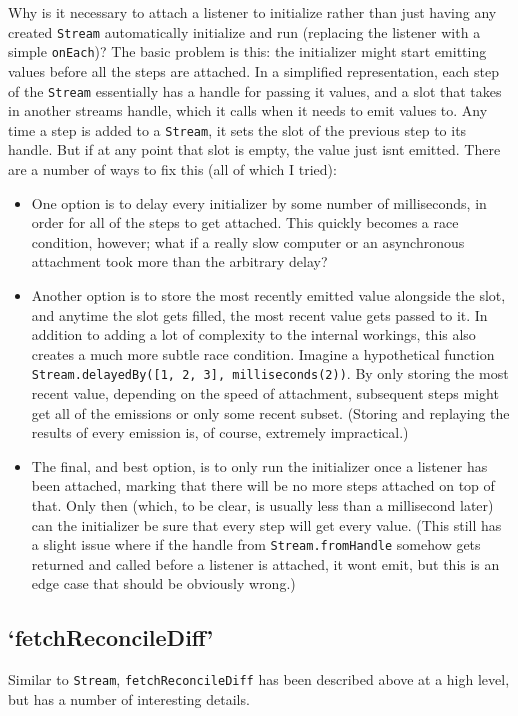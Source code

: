 \documentclass[manuscript,review,anonymous]{acmart}
\begin{document}
Why is it necessary to attach a listener to initialize rather than just
having any created \texttt{Stream} automatically initialize and run
(replacing the listener with a simple \texttt{onEach})? The basic
problem is this: the initializer might start emitting values before all
the steps are attached. In a simplified representation, each step of the
\texttt{Stream} essentially has a handle for passing it values, and a
slot that takes in another stream\textquotesingle s handle, which it
calls when it needs to emit values to. Any time a step is added to a
\texttt{Stream}, it sets the slot of the previous step to its handle.
But if at any point that slot is empty, the value just
isn\textquotesingle t emitted. There are a number of ways to fix this
(all of which I tried):

\begin{itemize}
\tightlist
\item
  One option is to delay every initializer by some number of
  milliseconds, in order for all of the steps to get attached. This
  quickly becomes a race condition, however; what if a really slow
  computer or an asynchronous attachment took more than the arbitrary
  delay?
\item
  Another option is to store the most recently emitted value alongside
  the slot, and anytime the slot gets filled, the most recent value gets
  passed to it. In addition to adding a lot of complexity to the
  internal workings, this also creates a much more subtle race
  condition. Imagine a hypothetical function
  \texttt{Stream.delayedBy({[}1,\ 2,\ 3{]},\ milliseconds(2))}. By only
  storing the most recent value, depending on the speed of attachment,
  subsequent steps might get all of the emissions or only some recent
  subset. (Storing and replaying the results of every emission is, of
  course, extremely impractical.)
\item
  The final, and best option, is to only run the initializer once a
  listener has been attached, marking that there will be no more steps
  attached on top of that. Only then (which, to be clear, is usually
  less than a millisecond later) can the initializer be sure that every
  step will get every value. (This still has a slight issue where if the
  handle from \texttt{Stream.fromHandle} somehow gets returned and
  called before a listener is attached, it won\textquotesingle t emit,
  but this is an edge case that should be obviously wrong.)
\end{itemize}

\subsection{`fetchReconcileDiff'}
Similar to \texttt{Stream}, \texttt{fetchReconcileDiff} has been
described above at a high level, but has a number of interesting
details.
\end{document}
